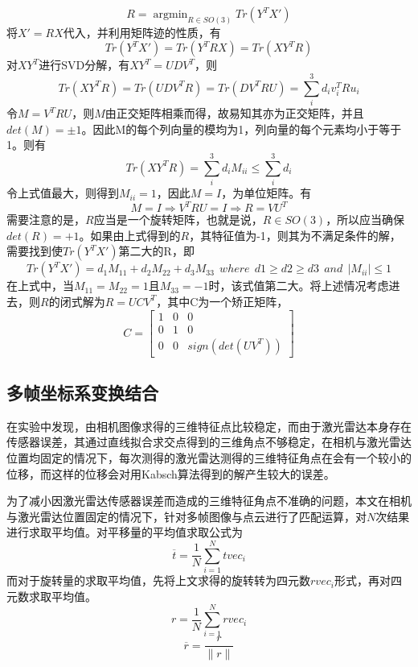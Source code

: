 \begin{equation}
    R = \mathop{\arg\min}_{R \in SO(3)} Tr(Y^TX')
\end{equation}
将$X'=RX$代入，并利用矩阵迹的性质，有
\begin{equation}
    Tr(Y^TX')=Tr(Y^TRX)=Tr(XY^TR)
\end{equation}
对$XY^T$进行SVD分解，有$XY^T=UDV^T$，则
\begin{equation}
    Tr(XY^TR)=Tr(UDV^TR)=Tr(DV^TRU)=\sum_i^3{d_iv_i^TRu_i}
\end{equation}
令$M=V^TRU$，则$M$由正交矩阵相乘而得，故易知其亦为正交矩阵，并且$det(M)=\pm 1$。因此M的每个列向量的模均为1，列向量的每个元素均小于等于1。则有
\begin{equation}
    Tr(XY^TR)=\sum_i^3{d_i M_{ii}} \leq \sum_i^3{d_i}
\end{equation}
令上式值最大，则得到$M_{ii}=1$，因此$M=I$，为单位矩阵。有
\begin{equation}
    M=I\Rightarrow V^TRU=I \Rightarrow R=VU^T
\end{equation}
需要注意的是，$R$应当是一个旋转矩阵，也就是说，$R \in SO(3)$，所以应当确保 $det(R)=+1$。如果由上式得到的$R$，其特征值为-1，则其为不满足条件的解，需要找到使$Tr(Y^TX')$第二大的R，即
\begin{equation}
    Tr(Y^TX')=d_1M_{11}+d_2M_{22}+d_3M_{33}\ \ where\ \ d1\geq d2 \geq d3 \ \ and\ \ |M_{ii}| \leq 1
\end{equation}
在上式中，当$M_{11}=M_{22}=1$且$M_{33}=-1$时，该式值第二大。将上述情况考虑进去，则$R$的闭式解为$R=UCV^T$，其中C为一个矫正矩阵，
$$
C=\begin{bmatrix} 1&0&0 \\ 0&1&0 \\ 0&0&sign(det(UV^T))
\end{bmatrix}
$$

\subsection{多帧坐标系变换结合}
在实验中发现，由相机图像求得的三维特征点比较稳定，而由于激光雷达本身存在传感器误差，其通过直线拟合求交点得到的三维角点不够稳定，在相机与激光雷达位置均固定的情况下，每次测得的激光雷达测得的三维特征角点在会有一个较小的位移，而这样的位移会对用Kabsch算法得到的解产生较大的误差。

为了减小因激光雷达传感器误差而造成的三维特征角点不准确的问题，本文在相机与激光雷达位置固定的情况下，针对多帧图像与点云进行了匹配运算，对$N$次结果进行求取平均值。对平移量的平均值求取公式为
$$\overline{t}=\frac{1}{N}\sum_{i=1}^N{{tvec}_i}$$
而对于旋转量的求取平均值，先将上文求得的旋转转为四元数${rvec}_i$形式，再对四元数求取平均值。
$$r=\frac{1}{N}\sum_{i=1}^N{{rvec}_i}$$
$$\overline{r}=\frac{r}{\|r\|}$$


